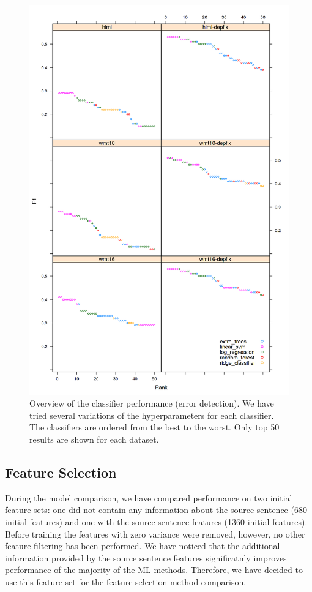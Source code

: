 \begin{figure}
\centering
  \includegraphics[scale=0.7]{wf-class}
  \caption{
    Overview of the classifier performance (error detection).
We have tried several variations of the hyperparameters
for each classifier. The classifiers are ordered from the best to the worst. Only top 50 results
are shown for each dataset.
}
  \label{wf-draft}
\end{figure}

\subsection{Feature Selection}

During the model comparison, we have compared performance on two initial feature sets:
one did not contain any information about the source sentence (\tilda{}680 initial features)
and one with the source sentence features (\tilda{}1360 initial features). Before training
the features with zero variance were removed, however, no other feature filtering has been
performed. We have noticed that the additional information provided by the source sentence features
significatnly improves performance of the majority of the ML methods. Therefore, we have decided
to use this feature set for the feature selection method comparison.

